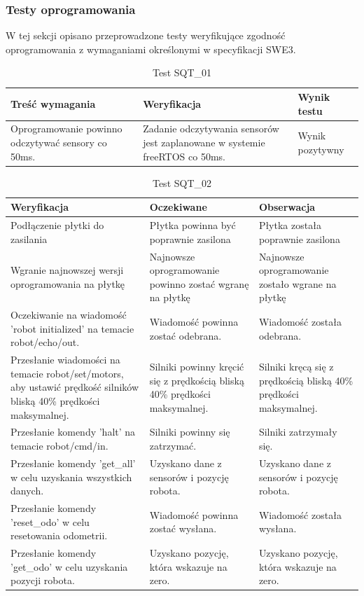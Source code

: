 \documentclass[12pt,twoside]{article}
\begin{document}
\newpage
\subsubsection{Testy oprogramowania}
W tej sekcji opisano przeprowadzone testy weryfikujące zgodność oprogramowania z wymaganiami określonymi w specyfikacji SWE3.

\begin{table}[ht]
\caption{Test SQT\_01}
\centering		
	\begin{tabular}{|p{}|p{}|p{}|}	
		\hline
		Treść wymagania & Weryfikacja & Wynik testu \\
		\hline
		Oprogramowanie powinno odczytywać sensory co 50ms. & Zadanie odczytywania sensorów jest zaplanowane w systemie freeRTOS co 50ms. & Wynik pozytywny \\
		\hline
	\end{tabular}	
	
\label{Tab:TEST1}
\end{table}	

\begin{table}[ht]
\caption{Test SQT\_02}
\centering		
	\begin{tabular}{|p{}|p{}|p{}|}	
		\hline
		Weryfikacja & Oczekiwane & Obserwacja \\
		\hline
		Podłączenie płytki do zasilania &
		Płytka powinna być poprawnie zasilona &
		Płytka została poprawnie zasilona \\
		\hline
		Wgranie najnowszej wersji oprogramowania na płytkę &
		Najnowsze oprogramowanie powinno zostać wgranę na płytkę &
		Najnowsze oprogramowanie zostało wgrane na płytkę \\
		\hline
		Oczekiwanie na wiadomość 'robot initialized' na temacie robot/echo/out. &
		Wiadomość powinna zostać odebrana. &
		Wiadomość została odebrana. \\
		\hline
		Przesłanie wiadomości na temacie robot/set/motors, aby ustawić prędkość silników bliską 40\% prędkości maksymalnej. 			&
		Silniki powinny kręcić się z prędkością bliską 40\% prędkości maksymalnej. &
		Silniki kręcą się z prędkością bliską 40\% prędkości maksymalnej. \\
		\hline
		Przesłanie komendy 'halt' na temacie robot/cmd/in. &
		Silniki powinny się zatrzymać. &
		Silniki zatrzymały się. \\
		\hline
		Przesłanie komendy 'get\_all' w celu uzyskania wszystkich danych. &
		Uzyskano dane z sensorów i pozycję robota. &
		Uzyskano dane z sensorów i pozycję robota. \\
		\hline
		Przesłanie komendy 'reset\_odo' w celu resetowania odometrii. &
		Wiadomość powinna zostać wysłana. &
		Wiadomość została wysłana. \\
		\hline
		Przesłanie komendy 'get\_odo' w celu uzyskania pozycji robota. &
		Uzyskano pozycję, która wskazuje na zero. &
		Uzyskano pozycję, która wskazuje na zero. \\
		\hline
	\end{tabular}	
	
\label{Tab:TEST1}
\end{table}	
\newpage
\end{document}
